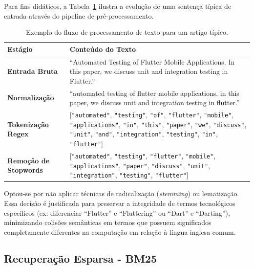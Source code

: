 \documentclass[12pt]{article}
\begin{document}
Para fins didáticos, a Tabela~\ref{tab:preprocessing_flow} ilustra a evolução de uma sentença típica de entrada através do pipeline de pré-processamento.

\begin{table}[htbp]
\centering
\caption{Exemplo do fluxo de processamento de texto para um artigo típico.}
\label{tab:preprocessing_flow}
\begin{tabular}{lp{10.5cm}}
\toprule
\textbf{Estágio} & \textbf{Conteúdo do Texto} \\ \midrule
\textbf{Entrada Bruta} & ``Automated Testing of Flutter Mobile Applications. In this paper, we discuss unit and integration testing in Flutter.'' \\ \midrule
\textbf{Normalização} & ``automated testing of flutter mobile applications. in this paper, we discuss unit and integration testing in flutter.'' \\ \midrule
\textbf{Tokenização Regex} & [\texttt{"automated"}, \texttt{"testing"}, \texttt{"of"}, \texttt{"flutter"}, \texttt{"mobile"}, \texttt{"applications"}, \texttt{"in"}, \texttt{"this"}, \texttt{"paper"}, \texttt{"we"}, \texttt{"discuss"}, \texttt{"unit"}, \texttt{"and"}, \texttt{"integration"}, \texttt{"testing"}, \texttt{"in"}, \texttt{"flutter"}] \\ \midrule
\textbf{Remoção de Stopwords} & [\texttt{"automated"}, \texttt{"testing"}, \texttt{"flutter"}, \texttt{"mobile"}, \texttt{"applications"}, \texttt{"paper"}, \texttt{"discuss"}, \texttt{"unit"}, \texttt{"integration"}, \texttt{"testing"}, \texttt{"flutter"}] \\ \bottomrule
\end{tabular}
\end{table}

Optou-se por não aplicar técnicas de radicalização (\textit{stemming}) ou lematização. Essa decisão é justificada para preservar a integridade de termos tecnológicos específicos (ex: diferenciar ``Flutter'' e ``Fluttering'' ou ``Dart'' e ``Darting''), minimizando colisões semânticas em termos que possuem significados completamente diferentes na computação em relação à língua inglesa comum.

\subsection{Recuperação Esparsa - BM25}
\end{document}
